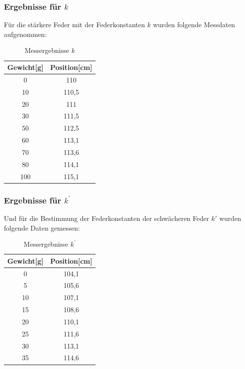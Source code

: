 \documentclass{article}
\begin{document}
          \subsubsection{Ergebnisse für $k$}
              Für die stärkere Feder mit der Federkonstanten $k$ wurden folgende Messdaten aufgenommen:
              \begin{table}[!h]
                  \centering
                  \begin{tabular}{ | c | c | }
                      \hline
                      Gewicht[g] & Position[cm] \\
                      \hline
                      0          & 110 \\
                      10         & 110,5 \\
                      20         & 111 \\
                      30         & 111,5 \\
                      50         & 112,5 \\
                      60         & 113,1 \\
                      70         & 113,6 \\
                      80         & 114,1 \\
                      100        & 115,1 \\
                      \hline
                  \end{tabular}
                  \caption{Messergebnisse $k$}
              \end{table}

          \subsubsection{Ergebnisse für $k^{\prime}$}
              Und für die Bestimmung der Federkonstanten der schwächeren Feder $k\prime$ wurden folgende Daten gemessen:
              \begin{table}[!h]
                  \centering
                  \begin{tabular}{ | c | c | }
                      \hline
                      Gewicht[g] & Position[cm] \\
                      \hline
                      0          & 104,1 \\
                      5          & 105,6 \\
                      10         & 107,1 \\
                      15         & 108,6 \\
                      20         & 110,1 \\
                      25         & 111,6 \\
                      30         & 113,1 \\
                      35         & 114,6 \\
                      \hline
                  \end{tabular}
                  \caption{Messergebnisse $k^{\prime}$}
              \end{table}
\end{document}
